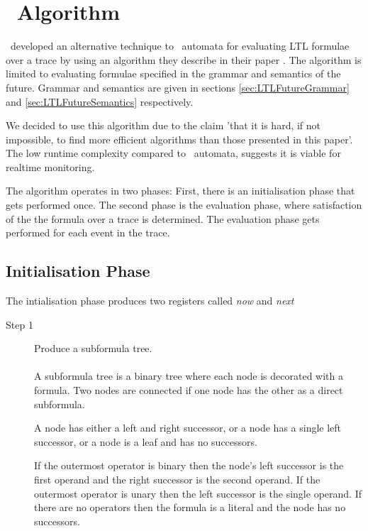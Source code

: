 \chapter{\RH\ Algorithm}
\label{chap:Rosu-Havelund Algorithm}

\GRKH\ developed an alternative technique to \Buchi\ automata for evaluating LTL formulae over a trace by using an algorithm they describe in their paper \cite{RosuHavelund}. The algorithm is limited to evaluating formulae specified in the grammar and semantics of the future. Grammar and semantics are given in sections \ref{sec:LTLFutureGrammar} and \ref{sec:LTLFutureSemantics} respectively.

We decided to use this algorithm due to the claim 'that it is hard, if not impossible, to find more efficient algorithms than those presented in this paper'. The low runtime complexity compared to \Buchi\ automata, suggests it is viable for realtime monitoring.

The algorithm operates in two phases: First, there is an initialisation phase that gets performed once.  The second phase is the evaluation phase, where satisfaction of the the formula over a trace is determined. The evaluation phase gets performed for each event in the trace.

\section{Initialisation Phase}
\label{sec:InitialisationPhase}
The intialisation phase produces two registers called \textit{now} and \textit{next}

\begin{description}
\item[Step 1] Produce a subformula tree.\\
\\
A subformula tree is a binary tree where each node is decorated with a formula.  Two nodes are connected if one node has the other as a direct subformula.

A node has either a left and right successor, or a node has a single left successor, or a node is a leaf and has no successors.

If the outermost operator is binary then the node's left successor is the first operand and the right successor is the second operand.  If the outermost operator is unary then the left successor is the single operand.  If there are no operators then the formula is a literal and the node has no successors.\\\end{description}

